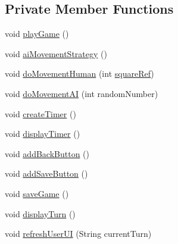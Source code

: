 \subsection*{Private Member Functions}
\begin{DoxyCompactItemize}
\item 
void \hyperlink{class_display_1_1_display_t_t_t_ac07792d99f73ff42f0e0dc33478769d5}{play\+Game} ()
\item 
void \hyperlink{class_display_1_1_display_t_t_t_aaea43cb629cc58c12088f1ec6106d87b}{ai\+Movement\+Strategy} ()
\item 
void \hyperlink{class_display_1_1_display_t_t_t_a4aa462f648708a3254eeb61dd67fe798}{do\+Movement\+Human} (int \hyperlink{class_display_1_1_display_t_t_t_a72b67bc50aa6ba47ae9d398e597c49bb}{square\+Ref})
\item 
void \hyperlink{class_display_1_1_display_t_t_t_a0ddb1f67a9836bcb8c13bb2c4c1da714}{do\+Movement\+A\+I} (int random\+Number)
\item 
void \hyperlink{class_display_1_1_display_t_t_t_ac13c73a58635d5c5779c8381d5ad9b6d}{create\+Timer} ()
\item 
void \hyperlink{class_display_1_1_display_t_t_t_a2603790df7e6e53a5d07701eb08b1432}{display\+Timer} ()
\item 
void \hyperlink{class_display_1_1_display_t_t_t_a54c366271479ec124f298ab5f00104f0}{add\+Back\+Button} ()
\item 
void \hyperlink{class_display_1_1_display_t_t_t_a21dad65008eb0c5db1b388bb403d7ef1}{add\+Save\+Button} ()
\item 
void \hyperlink{class_display_1_1_display_t_t_t_a28723b7297cdcc1b2c27553607ac00ac}{save\+Game} ()
\item 
void \hyperlink{class_display_1_1_display_t_t_t_aa07f5377555ef459f8ce5b4735aa402e}{display\+Turn} ()
\item 
void \hyperlink{class_display_1_1_display_t_t_t_a9afa2fb48121f1e4915d4d851c94b20a}{refresh\+User\+U\+I} (String current\+Turn)
\end{DoxyCompactItemize}
